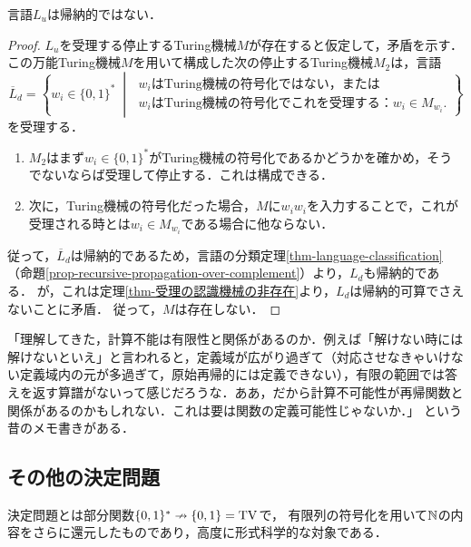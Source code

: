 \documentclass[uplatex, dvipdfmx]{jsreport}
\begin{document}
\begin{theorem}[停止性判定問題は解けない]\label{thm-undecidableness-of-halting-problem}
    言語$L_u$は帰納的ではない．
\end{theorem}
\begin{proof}
    $L_u$を受理する停止するTuring機械$M$が存在すると仮定して，矛盾を示す．
    この万能Turing機械$M$を用いて構成した次の停止するTuring機械$M_2$は，言語
    \[\overline{L}_d=\left\{w_i\in\{0,1\}^*\;\middle|\;\begin{array}{l}
        w_iは\mathrm{Turing}機械の符号化ではない，または\\
        w_iは\mathrm{Turing}機械の符号化でこれを受理する：w_i\in M_{w_i}.
    \end{array}\right\}\]
    を受理する．
    \begin{enumerate}
        \item $M_2$はまず$w_i\in\{0,1\}^*$がTuring機械の符号化であるかどうかを確かめ，そうでないならば受理して停止する．これは構成できる．
        \item 次に，Turing機械の符号化だった場合，$M$に$w_iw_i$を入力することで，これが受理される時とは$w_i\in M_{w_i}$である場合に他ならない．
    \end{enumerate}
    従って，$\overline{L}_d$は帰納的であるため，言語の分類定理\ref{thm-language-classification}（命題\ref{prop-recursive-propagation-over-complement}）より，$L_d$も帰納的である．
    が，これは定理\ref{thm-受理の認識機械の非存在}より，$L_d$は帰納的可算でさえないことに矛盾．
    従って，$M$は存在しない．
\end{proof}
\begin{remarks}
    「理解してきた，計算不能は有限性と関係があるのか．例えば「解けない時には解けないといえ」と言われると，定義域が広がり過ぎて（対応させなきゃいけない定義域内の元が多過ぎて，原始再帰的には定義できない），有限の範囲では答えを返す算譜がないって感じだろうな．ああ，だから計算不可能性が再帰関数と関係があるのかもしれない．これは要は関数の定義可能性じゃないか．」
    という昔のメモ書きがある．
\end{remarks}

\subsection{その他の決定問題}

\begin{tcolorbox}[colframe=ForestGreen, colback=ForestGreen!10!white, breakable]
    決定問題とは部分関数$\{0,1\}^*\nrightarrow\{0,1\}=\mathrm{TV}$で，
    有限列の符号化を用いて$\mathbb{N}$の内容をさらに還元したものであり，高度に形式科学的な対象である．
\end{tcolorbox}
\end{document}
